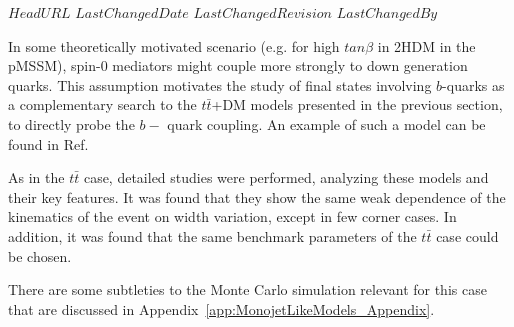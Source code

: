 \svnidlong
{$HeadURL$}
{$LastChangedDate$}
{$LastChangedRevision$}
{$LastChangedBy$}

\label{sec:ttdm}


In some theoretically motivated scenario (e.g. for high $tan\beta$ in 2HDM in the pMSSM), 
spin-0 mediators might couple more strongly to down generation quarks.
 This assumption motivates the study of final states involving $b$-quarks 
 as a complementary search to the $t\bar
t$+DM models presented in the previous section, to directly probe the $b-$ quark coupling. 
An example of such a model can be found in Ref.~\cite{Buckley:2014fba}

As in the $t\bar t$ case, detailed studies were performed, analyzing 
these models and their key features. It was found that they show the
same weak dependence of the kinematics of the event on width
variation, except in few corner cases. In addition, it was found that
the same benchmark parameters of the $t\bar t$ case could be chosen.

There are some subtleties to the Monte Carlo simulation relevant for
this case that are discussed in Appendix~\ref{app:MonojetLikeModels_Appendix}.

%
%
